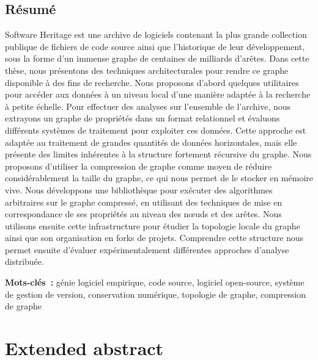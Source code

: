 \begin{minipage}[b][0.49\textheight][t]{0.96\textwidth}
\vspace{6mm}

\section*{Résumé}
\begin{SingleSpace}

Software Heritage est une archive de logiciels contenant la plus
grande collection publique de fichiers de code source ainsi que l'historique de
leur développement, sous la forme d'un immense graphe de centaines de milliards
d'arêtes. Dans cette thèse, nous présentons des techniques architecturales pour
rendre ce graphe disponible à des fins de recherche. Nous proposons d'abord
quelques utilitaires pour accéder aux données à un niveau local d'une manière
adaptée à la recherche à petite échelle. Pour effectuer des analyses sur
l'ensemble de l'archive, nous extrayons un graphe de propriétés dans un format
relationnel et évaluons différents systèmes de traitement pour exploiter ces
données. Cette approche est adaptée au traitement de grandes quantités de
données horizontales, mais elle présente des limites inhérentes à la structure
fortement récursive du graphe. Nous proposons d'utiliser la compression de
graphe comme moyen de réduire considérablement la taille du graphe, ce qui nous
permet de le stocker en mémoire vive. Nous développons une bibliothèque pour
exécuter des algorithmes arbitraires sur le graphe compressé, en utilisant
des techniques de mise en correspondance de ses propriétés au
niveau des nœuds et des arêtes. Nous utilisons ensuite cette infrastructure
pour étudier la topologie locale du graphe ainsi que son organisation en forks
de projets. Comprendre cette structure nous permet ensuite
d'évaluer expérimentalement différentes approches d'analyse distribuée.

\vspace{3mm}

\textbf{Mots-clés~:} génie logiciel empirique, code source, logiciel
open-source, système de gestion de version, conservation numérique, topologie
de graphe, compression de graphe

\end{SingleSpace}
\end{minipage}

\clearpage

\chapter*{Extended abstract}

